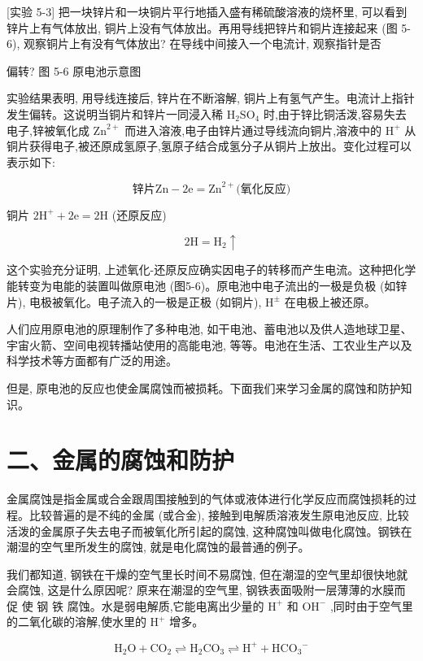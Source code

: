 \documentclass[10pt]{article}
\begin{document}
[实验 5-3] 把一块锌片和一块铜片平行地插入盛有稀硫酸溶液的烧杯里, 可以看到锌片上有气体放出, 铜片上没有气体放出。再用导线把锌片和铜片连接起来 (图 5-6), 观察铜片上有没有气体放出? 在导线中间接入一个电流计, 观察指针是否

偏转? 图 5-6 原电池示意图

实验结果表明, 用导线连接后, 锌片在不断溶解, 铜片上有氢气产生。电流计上指针发生偏转。这说明当铜片和锌片一同浸入稀 \({\mathrm{H}}_{2}{\mathrm{{SO}}}_{4}\) 时,由于锌比铜活泼,容易失去电子,锌被氧化成 \({\mathrm{{Zn}}}^{2 + }\) 而进入溶液,电子由锌片通过导线流向铜片,溶液中的 \({\mathrm{H}}^{ + }\) 从铜片获得电子,被还原成氢原子,氢原子结合成氢分子从铜片上放出。变化过程可以表示如下:

\[
\text{锌片}\mathrm{{Zn}} - 2\mathrm{e} = {\mathrm{{Zn}}}^{2 + }\text{(氧化反应)}
\]

铜片 \(2{\mathrm{H}}^{ + } + 2\mathrm{e} = 2\mathrm{H}\) (还原反应)

\[
2\mathrm{H} = {\mathrm{H}}_{2} \uparrow
\]

这个实验充分证明, 上述氧化-还原反应确实因电子的转移而产生电流。这种把化学能转变为电能的装置叫做原电池 (图5-6)。原电池中电子流出的一极是负极 (如锌片), 电极被氧化。电子流入的一极是正极 (如铜片), \({\mathrm{H}}^{ \pm }\) 在电极上被还原。

人们应用原电池的原理制作了多种电池, 如干电池、蓄电池以及供人造地球卫星、宇宙火箭、空间电视转播站使用的高能电池, 等等。电池在生活、工农业生产以及科学技术等方面都有广泛的用途。

但是, 原电池的反应也使金属腐蚀而被损耗。下面我们来学习金属的腐蚀和防护知识。

\section*{二、金属的腐蚀和防护}

金属腐蚀是指金属或合金跟周围接触到的气体或液体进行化学反应而腐蚀损耗的过程。比较普遍的是不纯的金属 (或合金), 接触到电解质溶液发生原电池反应, 比较活泼的金属原子失去电子而被氧化所引起的腐蚀, 这种腐蚀叫做电化腐蚀。钢铁在潮湿的空气里所发生的腐蚀, 就是电化腐蚀的最普通的例子。

我们都知道, 钢铁在干燥的空气里长时间不易腐蚀, 但在潮湿的空气里却很快地就会腐蚀, 这是什么原因呢? 原来在潮湿的空气里, 钢铁表面吸附一层薄薄的水膜而促 使 钢 铁 腐蚀。水是弱电解质,它能电离出少量的 \({\mathrm{H}}^{ + }\) 和 \({\mathrm{{OH}}}^{ - }\) ,同时由于空气里的二氧化碳的溶解,使水里的 \({\mathrm{H}}^{ + }\) 增多。

\[
{\mathrm{H}}_{2}\mathrm{O} + {\mathrm{{CO}}}_{2} \rightleftharpoons {\mathrm{H}}_{2}{\mathrm{{CO}}}_{3} \rightleftharpoons {\mathrm{H}}^{ + } + {\mathrm{{HCO}}}_{3}{}^{ - }
\]
\end{document}
